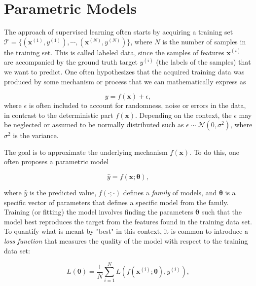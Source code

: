 \section{Parametric Models}\label{sec:ParametricModels}
The approach of supervised learning often starts by acquiring a training set $\mathcal{T} = \{(\boldsymbol{x}^{(1)}, y^{(1)}), \cdots, (\boldsymbol{x}^{(N)}, y^{(N)})\}$, where $N$ is the number of samples in the training set. This is called labeled data, since the samples of features $\boldsymbol{x}^{(i)}$ are accompanied by the ground truth target $y^{(i)}$ (the labels of the samples) that we want to predict. One often hypothesizes that the acquired training data was produced by some mechanism or process that we can mathematically express as

\begin{equation}\label{eq:data}
    y = f(\boldsymbol{x}) + \epsilon,
\end{equation}
where $\epsilon$ is often included to account for randomness, noise or errors in the data, in contrast to the deterministic part $f(\boldsymbol{x})$. Depending on the context, the $\epsilon$ may be neglected or assumed to be normally distributed such as $\epsilon \sim \mathcal{N}(0, \sigma^2)$, where $\sigma^2$ is the variance.

The goal is to approximate the underlying mechanism $f(\boldsymbol{x})$. To do this, one often proposes a parametric model

\begin{equation*}
    \hat{y} = f(\boldsymbol{x}; \boldsymbol{\theta}),
\end{equation*}

where $\hat{y}$ is the predicted value, $f(\cdot; \cdot)$ defines a \emph{family} of models, and $\boldsymbol{\theta}$ is a specific vector of parameters that defines a specific model from the family. Training (or fitting) the model involves finding the parameters $\boldsymbol{\theta}$ such that the model best reproduces the target from the features found in the training data set. To quantify what is meant by "best" in this context, it is common to introduce a \emph{loss function} that measures the quality of the model with respect to the training data set:

\begin{equation}\label{eq:LossFunction}
    L(\boldsymbol{\theta}) = \frac{1}{N}\sum_{i=1}^{N} L(f(\boldsymbol{x}^{(i)}; \boldsymbol{\theta}) , y^{(i)}),
\end{equation}

